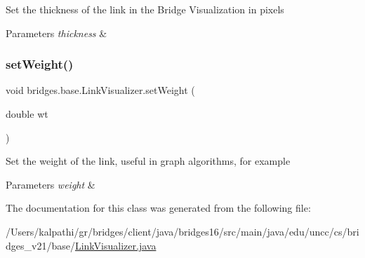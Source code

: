 Set the thickness of the link in the Bridge Visualization in pixels


\begin{DoxyParams}{Parameters}
{\em thickness} & \\
\hline
\end{DoxyParams}
\hypertarget{classbridges_1_1base_1_1_link_visualizer_a21d5884d243cf5a08f9d544f5083a44c}{}\label{classbridges_1_1base_1_1_link_visualizer_a21d5884d243cf5a08f9d544f5083a44c} 
\subsubsection{\texorpdfstring{set\+Weight()}{setWeight()}}
{\footnotesize\ttfamily void bridges.\+base.\+Link\+Visualizer.\+set\+Weight (\begin{DoxyParamCaption}\item[{double}]{wt }\end{DoxyParamCaption})}

Set the weight of the link, useful in graph algorithms, for example


\begin{DoxyParams}{Parameters}
{\em weight} & \\
\hline
\end{DoxyParams}


The documentation for this class was generated from the following file\+:\begin{DoxyCompactItemize}
\item 
/\+Users/kalpathi/gr/bridges/client/java/bridges16/src/main/java/edu/uncc/cs/bridges\+\_\+v21/base/\hyperlink{_link_visualizer_8java}{Link\+Visualizer.\+java}\end{DoxyCompactItemize}
